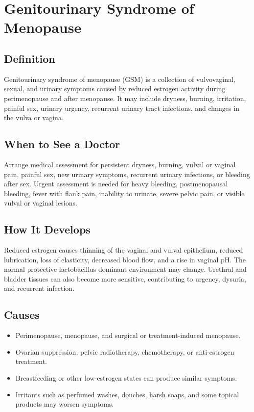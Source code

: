 \chapter{Genitourinary Syndrome of Menopause}

\section*{Definition}
Genitourinary syndrome of menopause (GSM) is a collection of vulvovaginal, sexual, and urinary symptoms caused by reduced estrogen activity during perimenopause and after menopause. It may include dryness, burning, irritation, painful sex, urinary urgency, recurrent urinary tract infections, and changes in the vulva or vagina.

\section*{When to See a Doctor}
Arrange medical assessment for persistent dryness, burning, vulval or vaginal pain, painful sex, new urinary symptoms, recurrent urinary infections, or bleeding after sex. Urgent assessment is needed for heavy bleeding, postmenopausal bleeding, fever with flank pain, inability to urinate, severe pelvic pain, or visible vulval or vaginal lesions.

\section*{How It Develops}
Reduced estrogen causes thinning of the vaginal and vulval epithelium, reduced lubrication, loss of elasticity, decreased blood flow, and a rise in vaginal pH. The normal protective lactobacillus-dominant environment may change. Urethral and bladder tissues can also become more sensitive, contributing to urgency, dysuria, and recurrent infection.

\section*{Causes}
\begin{itemize}
  \item Perimenopause, menopause, and surgical or treatment-induced menopause.
  \item Ovarian suppression, pelvic radiotherapy, chemotherapy, or anti-estrogen treatment.
  \item Breastfeeding or other low-estrogen states can produce similar symptoms.
  \item Irritants such as perfumed washes, douches, harsh soaps, and some topical products may worsen symptoms.
\end{itemize}

